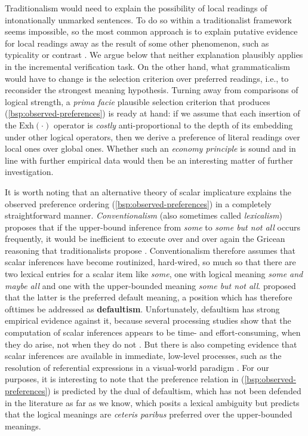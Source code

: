 \documentclass[fleqn,reqno,10pt,draft]{article}
\newcommand{\exh}{\ensuremath{\mathrm{Exh}}}
\renewcommand{\mymark}[1]{\textbf{#1}}
\begin{document}
Traditionalism would need to explain the possibility of local readings
of intonationally unmarked sentences. To do so within a traditionalist
framework seems impossible, so the most common approach is to explain
putative evidence for local readings away as the result of some other
phenomenon, such as typicality or contrast
\citep{Tielvan-Tiel2012:Embedded-Scalar,GeurtsTielvan-Tiel2013:Scalar-expressi}. We
argue below that neither explanation plausibly applies in the
incremental verification task. On the other hand, what grammaticalism
would have to change is the selection criterion over preferred
readings, i.e., to reconsider the strongest meaning
hypothesis. Turning away from comparisons of logical strength, a
\emph{prima facie} plausible selection criterion that produces
(\ref{bsp:observed-preferences}) is ready at hand: if we assume that
each insertion of the $\exh(\cdot)$ operator is \emph{costly}
anti-proportional to the depth of its embedding under other logical
operators, then we derive a preference of literal readings over local
ones over global ones. Whether such an \emph{economy principle} is
sound and in line with further empirical data would then be an
interesting matter of further investigation.

It is worth noting that an alternative theory of scalar implicature
explains the observed preference ordering
(\ref{bsp:observed-preferences}) in a completely straightforward
manner.  \emph{Conventionalism} (also sometimes called
\emph{lexicalism}) proposes that if the upper-bound inference from
\emph{some} to \emph{some but not all} occurs frequently, it would be
inefficient to execute over and over again the Gricean reasoning that
traditionalists propose
\citep[e.g.][]{LevinsonPresumptiveMeanings2000,Chierchia:2004_ScalarImplicatures}. Conventionalism
therefore assumes that scalar inferences have become routinized,
hard-wired, so much so that there are two lexical entries for a scalar
item like \emph{some}, one with logical meaning \emph{some and maybe
  all} and one with the upper-bounded meaning \emph{some but not
  all}. \citet{LevinsonPresumptiveMeanings2000} proposed that the
latter is the preferred default meaning, a position which has
therefore ofttimes be addressed as \mymark{defaultism}. Unfortunately,
defaultism has strong empirical evidence against it, because several
processing studies show that the computation of scalar inferences
appears to be time- and effort-consuming, when they do arise, not when
they do not
\citep[see][]{BrehenyKatsos2006:Are-Generalised,BrehenyKatsos2008:Experimental-In,NeysDe-NeysSchaeken2007:When-People-Are}. But
there is also competing evidence that scalar inferences are available
in immediate, low-level processes, such as the resolution of
referential expressions in a visual-world paradigm
\citep{GrodnerKlein2010:Some-and-Possib}. For our purposes, it is
interesting to note that the preference relation in
(\ref{bsp:observed-preferences}) is predicted by the dual of
defaultism, which has not been defended in the literature as far as we
know, which posits a lexical ambiguity but predicts that the logical
meanings are \emph{ceteris paribus} preferred over the upper-bounded
meanings.
\end{document}
